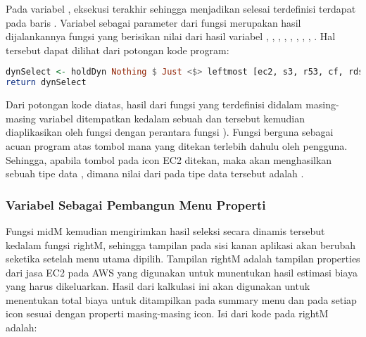 \documentclass[pi.tex]{subfile}
\begin{document}
\hspace{10pt}Pada variabel , eksekusi terakhir sehingga menjadikan  selesai terdefinisi terdapat pada baris . Variabel  sebagai parameter dari fungsi  merupakan hasil dijalankannya fungsi  yang berisikan nilai dari hasil variabel , , , , , , , , . Hal tersebut dapat dilihat dari potongan kode program:\\
\begin{lstlisting}[language=Haskell]
dynSelect <- holdDyn Nothing $ Just <$> leftmost [ec2, s3, r53, cf, rds, db, ec, vpc, ls]
return dynSelect
\end{lstlisting}

\hspace{10pt}Dari potongan kode diatas, hasil dari fungsi  yang terdefinisi didalam masing-masing variabel ditempatkan kedalam sebuah  dan  tersebut kemudian diaplikasikan oleh fungsi  dengan perantara fungsi \fhaskell{(<\$>}). Fungsi  berguna sebagai acuan program atas tombol mana yang ditekan terlebih dahulu oleh pengguna. Sehingga, apabila tombol pada icon EC2 ditekan, maka  akan menghasilkan sebuah tipe data , dimana nilai dari  pada tipe data tersebut adalah .


\subsubsection{Variabel  Sebagai Pembangun Menu Properti}\hspace{10pt}
  Fungsi midM kemudian mengirimkan hasil seleksi secara dinamis tersebut kedalam fungsi rightM, sehingga tampilan pada sisi kanan aplikasi akan berubah seketika setelah menu utama dipilih. Tampilan rightM adalah tampilan properties dari jasa EC2 pada AWS yang digunakan untuk munentukan hasil estimasi biaya yang harus dikeluarkan. Hasil dari kalkulasi ini akan digunakan untuk menentukan total biaya untuk ditampilkan pada summary menu dan pada setiap icon sesuai dengan properti masing-masing icon. Isi dari kode pada rightM adalah:\\
     
\end{document}
